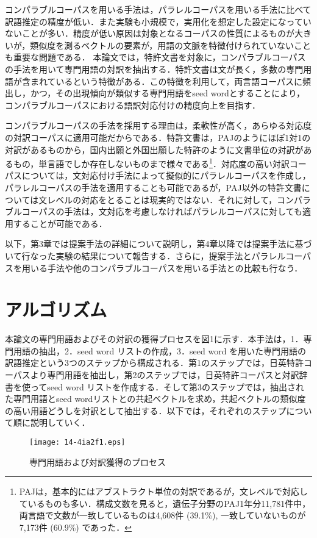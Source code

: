 \documentclass[japanese]{jnlp_1.3e}
\begin{document}
コンパラブルコーパスを用いる手法は，パラレルコーパスを用いる手法に比べて訳語推定の精度が低い．また実験も小規模で，実用化を想定した設定になっていないことが多い．精度が低い原因は対象となるコーパスの性質によるものが大きいが，類似度を測るベクトルの要素が，用語の文脈を特徴付けられていないことも重要な問題である．
本論文では，特許文書を対象に，コンパラブルコーパスの手法を用いて専門用語の対訳を抽出する．特許文書は文が長く，多数の専門用語が含まれているという特徴がある．この特徴を利用して，両言語コーパスに頻出し，かつ，その出現傾向が類似する専門用語をseed wordとすることにより，コンパラブルコーパスにおける語訳対応付けの精度向上を目指す．

コンパラブルコーパスの手法を採用する理由は，柔軟性が高く，あらゆる対応度の対訳コーパスに適用可能だからである．特許文書は，PAJのようにほぼ1対1の対訳があるものから，国内出願と外国出願した特許のように文書単位の対訳があるもの，単言語でしか存在しないものまで様々である\footnote{PAJは，基本的にはアブストラクト単位の対訳であるが，文レベルで対応しているものも多い．構成文数を見ると，遺伝子分野のPAJ1年分11,781件中，両言語で文数が一致しているものは4,608件 (39.1\%), 一致していないものが7,173件 (60.9\%) であった．}．対応度の高い対訳コーパスについては，文対応付け手法によって擬似的にパラレルコーパスを作成し，パラレルコーパスの手法を適用することも可能であるが，PAJ以外の特許文書については文レベルの対応をとることは現実的ではない．それに対して，コンパラブルコーパスの手法は，文対応を考慮しなければパラレルコーパスに対しても適用することが可能である．

以下，第3章では提案手法の詳細について説明し，第4章以降では提案手法に基づいて行なった実験の結果について報告する．さらに，提案手法とパラレルコーパスを用いる手法や他のコンパラブルコーパスを用いる手法との比較も行なう．


\section{アルゴリズム}

本論文の専門用語およびその対訳の獲得プロセスを図1に示す．本手法は，1．専門用語の抽出，2．seed word リストの作成，3．seed word を用いた専門用語の訳語推定という3つのステップから構成される．第1のステップでは，日英特許コーパスより専門用語を抽出し，第2のステップでは，日英特許コーパスと対訳辞書を使ってseed word リストを作成する．そして第3のステップでは，抽出された専門用語とseed wordリストとの共起ベクトルを求め，共起ベクトルの類似度の高い用語どうしを対訳として抽出する．以下では，それぞれのステップについて順に説明していく．
\begin{figure}[t]
\label{fig:outline}
\begin{center}
    \texttt{[image: 14-4ia2f1.eps]}
\caption{専門用語および対訳獲得のプロセス}
\end{center}
\end{figure}
\end{document}

